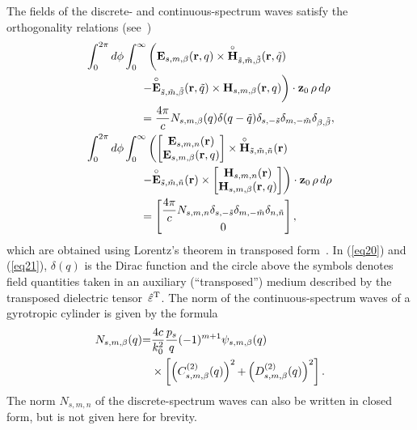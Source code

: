 \documentclass[conference,a4paper]{IEEEtran}
\begin{document}
The fields of the discrete- and continuous-spectrum waves  satisfy the orthogonality relations (see~\cite{Kondratev1999,Shevchenko1971,Eskin2017})
\begin{align}
&\int_0^{2\pi}d\f\int_0^\infty\left( {\bf E}_{s,m,\b}({\bf r},q)\times
\lefteqn{\cir{\phantom{\bf H}}}{\bf H}_{\tilde s,\tilde{m},\tilde{\b}}({\bf r},\tilde q) \right.\nonumber\\
&\hspace{17 mm}\left. - \lefteqn{\cir{\phantom{\bf E}}}{\bf E}_{\tilde
	s,\tilde{m},\tilde{\b}}({\bf r},\tilde q) \times {\bf H}_{s,m,\b} ({\bf r},q)
\right)\cdot{\bf z}_0\,\rho\,d\rho \nonumber\\
&\hspace{17 mm}=\displaystyle{\frac{4\pi}{c}}N_{s,m,\b}(q)\delta(q-\tilde
q)\delta_{s,-\tilde s}\delta_{m,-\tilde m}\delta_{\b,\tilde \b},\label{eq20}\\
&\int_0^{2\pi}d\f\int_0^\infty \left( \begin{bmatrix}{\bf
	E}_{{s},m,n}({\bf r})\\ {\bf E}_{s,m,\b} ({\bf
	r},q)\end{bmatrix}\times \lefteqn{\cir{\phantom{\bf H}}}{\bf H}_{\tilde s, \tilde{m},\tilde n}({\bf r}) \right.\nonumber\\
&\hspace{17 mm}\left. - \lefteqn{\cir{\phantom{\bf E}}}{\bf E}_{\tilde s,\tilde{m},\tilde n} ({\bf
	r}) \times
\begin{bmatrix}{\bf H}_{{s},m,n}({\bf r})\\ {\bf H}_{s,m,\b}({\bf
	r},q)\end{bmatrix}\right)\cdot{\bf z}_0\,\rho\,d\rho\nonumber\\
&\hspace{17 mm}=\begin{bmatrix} \displaystyle{\frac{4\pi}{c}}N_{{s},m,n}\delta_{s,-\tilde s}\delta_{m,-\tilde m}\delta_{n,\tilde n}\\ 0\end{bmatrix},\label{eq21}
\end{align}
which are obtained using Lorentz's theorem in transposed form~\cite{Kondratev1999}. In (\ref{eq20}) and (\ref{eq21}), $\delta(q)$ is the Dirac
function and the circle above the symbols denotes field quantities taken in an auxiliary (``transposed'') medium described by the transposed dielectric tensor~${\hat{\varepsilon}}^{\rm T}$. The
norm of the continuous-spectrum waves of a gyrotropic cylinder is
given by the formula
\begin{align}\label{eq22}
{N}_{s,m,\beta}(q){=}&\frac{4 c}{k_0^2}\frac{p_s}{q} (-1)^{m+1}\psi_{s,m,\beta}(q)\nonumber\\
&\times \left[\left(C_{s,m,\beta}^{(2)}(q)\right)^{2} {+} \left(D_{s,m,\beta}^{(2)}(q)\right)^{2}\right].
\end{align}
The norm ${N}_{s,m,n}$ of the discrete-spectrum waves can also be written in closed form, but is not given here for brevity.
\end{document}
